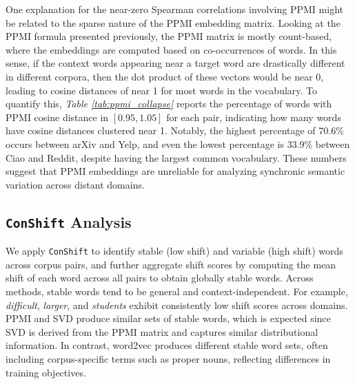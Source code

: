 \documentclass[11pt]{article}
\begin{document}
One explanation for the near-zero Spearman correlations involving PPMI might be related to the sparse nature of the PPMI embedding matrix. Looking at the PPMI formula presented previously, the PPMI matrix is mostly count-based, where the embeddings are computed based on co-occurrences of words. In this sense, if the context words appearing near a target word are drastically different in different corpora, then the dot product of these vectors would be near 0, leading to cosine distances of near 1 for most words in the vocabulary. To quantify this, \textit{Table \ref{tab:ppmi_collapse}} reports the percentage of words with PPMI cosine distance in $[0.95, 1.05]$ for each pair, indicating how many words have cosine distances clustered near 1. Notably, the highest percentage of 70.6\% occurs between arXiv and Yelp, and even the lowest percentage is 33.9\% between Ciao and Reddit, despite having the largest common vocabulary. These numbers suggest that PPMI embeddings are unreliable for analyzing synchronic semantic variation across distant domains.

\begin{table}[t]
    \centering
    \caption{Percentage of words with PPMI cosine distance $\in [0.95, 1.05]$}
    \label{tab:ppmi_collapse}
\end{table} 

\subsection{\texttt{ConShift} Analysis}

We apply \texttt{ConShift} to identify stable (low shift) and variable (high shift) words across corpus pairs, and further aggregate shift scores by computing the mean shift of each word across all pairs to obtain globally stable words. Across methods, stable words tend to be general and context-independent. For example, \textit{difficult}, \textit{larger}, and \textit{students} exhibit consistently low shift scores across domains. PPMI and SVD produce similar sets of stable words, which is expected since SVD is derived from the PPMI matrix and captures similar distributional information. In contrast, word2vec produces different stable word sets, often including corpus-specific terms such as proper nouns, reflecting differences in training objectives.
\end{document}
